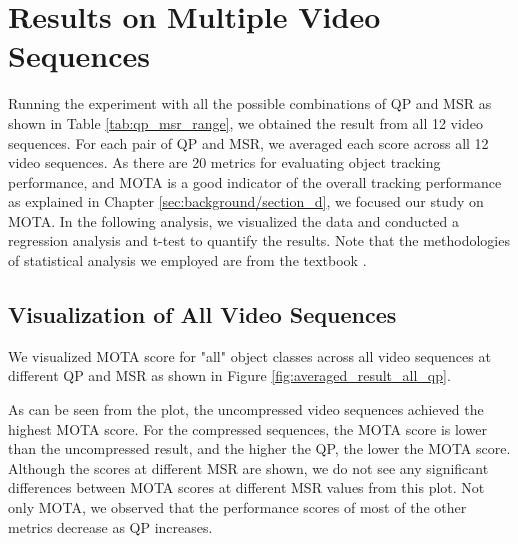 \section{Results on Multiple Video Sequences}
\label{sec:results/section_a}

Running the experiment with all the possible combinations of QP and MSR as shown in Table \ref{tab:qp_msr_range}, we obtained the result from all 12 video sequences. For each pair of QP and MSR, we averaged each score across all 12 video sequences. As there are 20 metrics for evaluating object tracking performance, and MOTA is a good indicator of the overall tracking performance as explained in Chapter \ref{sec:background/section_d}, we focused our study on MOTA. In the following analysis, we visualized the data and conducted a regression analysis and t-test to quantify the results. Note that the methodologies of statistical analysis we employed are from the textbook \cite{kutner_applied_2005}.


\subsection{Visualization of All Video Sequences}
\label{subsec:/results/section_a/visualization}
We visualized MOTA score for "all" object classes across all video sequences at different QP and MSR as shown in Figure \ref{fig:averaged_result_all_qp}.

As can be seen from the plot, the uncompressed video sequences achieved the highest MOTA score. For the compressed sequences, the MOTA score is lower than the uncompressed result, and the higher the QP, the lower the MOTA score. Although the scores at different MSR are shown, we do not see any significant differences between MOTA scores at different MSR values from this plot. Not only MOTA, we observed that the performance scores of most of the other metrics decrease as QP increases.

